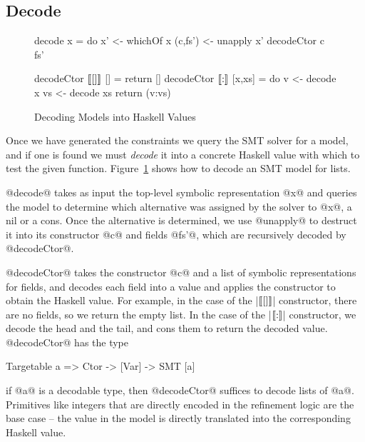 \subsection{Decode}\label{sec:decode}
%
\begin{figure}[t!]
\begin{mdframed}
\begin{minipage}{0.45\textwidth}
\begin{CenteredBox}
\begin{code}
decode x = do 
  x'      <- whichOf x
  (c,fs') <- unapply x'
  decodeCtor c fs'
\end{code}
\end{CenteredBox}
\end{minipage}
%
\begin{minipage}{0.55\textwidth}
\begin{CenteredBox}
\begin{mcode}
decodeCtor $[\![[]]\!]$ []    = return []
decodeCtor $[\![:]\!]$ [x,xs] = do
  v  <- decode x
  vs <- decode xs
  return (v:vs)
\end{mcode}
\end{CenteredBox}
\end{minipage}
\end{mdframed}
\caption{Decoding Models into Haskell Values}\label{fig:decode}
\end{figure}
%
Once we have generated the constraints we query the SMT solver 
for a model, and if one is found we must \emph{decode} it into
a concrete Haskell value with which to test the given function.
Figure~\ref{fig:decode} shows how to decode an SMT model for lists. 

 @decode@ takes as input the top-level symbolic
representation @x@ and queries the model to determine which
alternative was assigned by the solver to @x@, \ie a nil or a cons.
Once the alternative is determined, we use @unapply@ to destruct 
it into its constructor @c@ and fields @fs'@, which are recursively
decoded by @decodeCtor@.

 @decodeCtor@ takes the constructor @c@ and
a list of symbolic representations for fields, and decodes each 
field into a value and applies the constructor to obtain the 
Haskell value.
%
For example, in the case of the |$[\![[]]\!]$| constructor, there are no
fields, so we return the empty list. In the case of the |$[\![:]\!]$| 
constructor, we decode the head and the tail, and cons them to 
return the decoded value. 
%
@decodeCtor@ has the type
%
\begin{code}  
  Targetable a => Ctor -> [Var] -> SMT [a]
\end{code}
%
\ie if @a@ is a decodable type, then @decodeCtor@ suffices to decode lists of @a@.
%
Primitives like integers that are directly encoded 
in the refinement logic are the base case -- \ie the 
value in the model is directly translated into the 
corresponding Haskell value.


